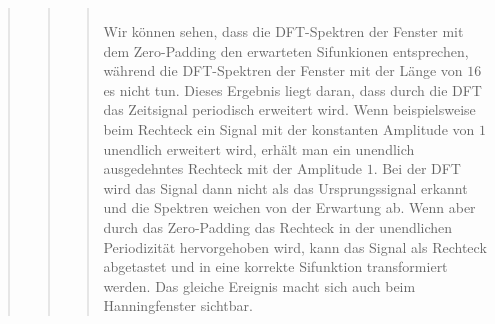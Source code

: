 \begin{quote}
\begin{quote}
\begin{quote}
\begin{center}
\begin{tabular}{ll}
                \end{tabular}
                \end{center}
                
        Wir können sehen, dass die DFT-Spektren der Fenster mit dem Zero-Padding
        den erwarteten Sifunkionen entsprechen, während die DFT-Spektren der
        Fenster mit der Länge von $16$ es nicht tun. Dieses Ergebnis liegt
        daran, dass durch die DFT das Zeitsignal periodisch erweitert wird. Wenn
        beispielsweise beim Rechteck ein Signal mit der konstanten Amplitude von
        $1$ unendlich erweitert wird, erhält man ein unendlich ausgedehntes Rechteck mit der
        Amplitude $1$. Bei der DFT wird das Signal dann nicht als das
        Ursprungssignal erkannt und die Spektren weichen von der Erwartung ab.
        Wenn aber durch das Zero-Padding das Rechteck in der unendlichen Periodizität hervorgehoben wird, 
        kann das Signal als Rechteck abgetastet und in eine korrekte Sifunktion transformiert
        werden. Das gleiche Ereignis macht sich auch beim Hanningfenster
        sichtbar. 
            
		\end{quote}
    \end{quote}
\end{quote}


